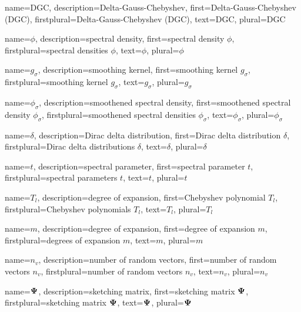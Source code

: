 {%
  name={DGC},%
  description={Delta-Gauss-Chebyshev},%
  first={Delta-Gauss-Chebyshev (DGC)},%
  firstplural={Delta-Gauss-Chebyshev (DGC)},%
  text={DGC},%
  plural={DGC}%
}


{%
  name={$\phi$},%
  description={spectral density},%
  first={spectral density $\phi$},%
  firstplural={spectral densities $\phi$},%
  text={$\phi$},%
  plural={$\phi$}%
}

{%
  name={$g_{\sigma}$},%
  description={smoothing kernel},%
  first={smoothing kernel $g_{\sigma}$},%
  firstplural={smoothing kernel $g_{\sigma}$},%
  text={$g_{\sigma}$},%
  plural={$g_{\sigma}$}%
}

{%
  name={$\phi_{\sigma}$},%
  description={smoothened spectral density},%
  first={smoothened spectral density $\phi_{\sigma}$},%
  firstplural={smoothened spectral densities $\phi_{\sigma}$},%
  text={$\phi_{\sigma}$},%
  plural={$\phi_{\sigma}$}%
}

{%
  name={$\delta$},%
  description={Dirac delta distribution},%
  first={Dirac delta distribution $\delta$},%
  firstplural={Dirac delta distributions $\delta$},%
  text={$\delta$},%
  plural={$\delta$}%
}

{%
  name={$t$},%
  description={spectral parameter},%
  first={spectral parameter $t$},%
  firstplural={spectral parameters $t$},%
  text={$t$},%
  plural={$t$}%
}

{%
  name={$T_l$},%
  description={degree of expansion},%
  first={Chebyshev polynomial $T_l$},%
  firstplural={Chebyshev polynomials $T_l$},%
  text={$T_l$},%
  plural={$T_l$}%
}

{%
  name={$m$},%
  description={degree of expansion},%
  first={degree of expansion $m$},%
  firstplural={degrees of expansion $m$},%
  text={$m$},%
  plural={$m$}%
}

{%
  name={$n_v$},%
  description={number of random vectors},%
  first={number of random vectors $n_v$},%
  firstplural={number of random vectors $n_v$},%
  text={$n_v$},%
  plural={$n_v$}%
}

{%
  name={$\boldsymbol{\Psi}$},%
  description={sketching matrix},%
  first={sketching matrix $\boldsymbol{\Psi}$},%
  firstplural={sketching matrix $\boldsymbol{\Psi}$},%
  text={$\boldsymbol{\Psi}$},%
  plural={$\boldsymbol{\Psi}$}%
}

